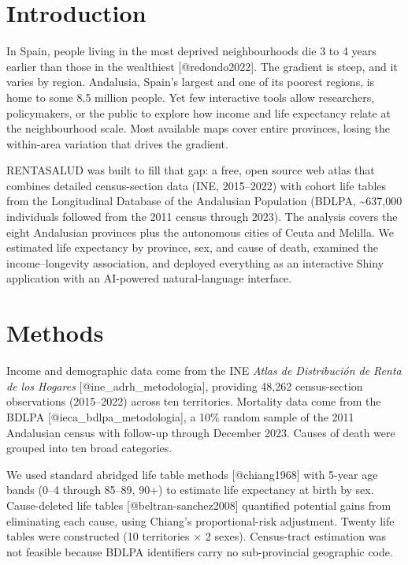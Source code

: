 \documentclass[
  11pt,
  a4paper,
]{article}
\begin{document}
\section{Introduction}\label{introduction}

In Spain, people living in the most deprived neighbourhoods die 3 to 4
years earlier than those in the wealthiest {[}@redondo2022{]}. The
gradient is steep, and it varies by region. Andalusia, Spain's largest
and one of its poorest regions, is home to some 8.5 million people. Yet
few interactive tools allow researchers, policymakers, or the public to
explore how income and life expectancy relate at the neighbourhood
scale. Most available maps cover entire provinces, losing the
within-area variation that drives the gradient.

RENTASALUD was built to fill that gap: a free, open source web atlas
that combines detailed census-section data (INE, 2015--2022) with cohort
life tables from the Longitudinal Database of the Andalusian Population
(BDLPA, \textasciitilde637,000 individuals followed from the 2011 census
through 2023). The analysis covers the eight Andalusian provinces plus
the autonomous cities of Ceuta and Melilla. We estimated life expectancy
by province, sex, and cause of death, examined the income--longevity
association, and deployed everything as an interactive Shiny application
with an AI-powered natural-language interface.

\section{Methods}\label{methods}

Income and demographic data come from the INE \emph{Atlas de
Distribución de Renta de los Hogares} {[}@ine\_adrh\_metodologia{]},
providing 48,262 census-section observations (2015--2022) across ten
territories. Mortality data come from the BDLPA
{[}@ieca\_bdlpa\_metodologia{]}, a 10\% random sample of the 2011
Andalusian census with follow-up through December 2023. Causes of death
were grouped into ten broad categories.

We used standard abridged life table methods {[}@chiang1968{]} with
5-year age bands (0--4 through 85--89, 90+) to estimate life expectancy
at birth by sex. Cause-deleted life tables {[}@beltran-sanchez2008{]}
quantified potential gains from eliminating each cause, using Chiang's
proportional-risk adjustment. Twenty life tables were constructed (10
territories × 2 sexes). Census-tract estimation was not feasible because
BDLPA identifiers carry no sub-provincial geographic code.
\end{document}
